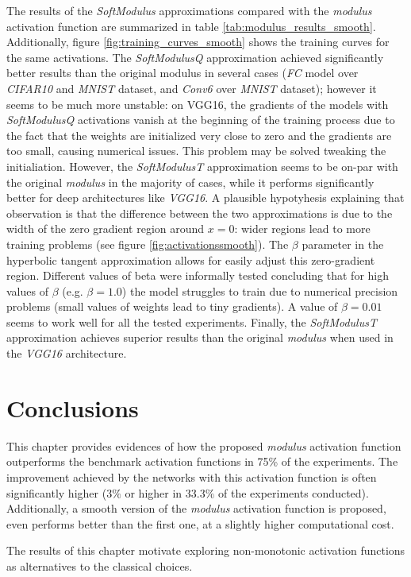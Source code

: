 The results of the \textit{SoftModulus} approximations compared with the \textit{modulus} activation function are summarized in table \ref{tab:modulus_results_smooth}. Additionally, figure \ref{fig:training_curves_smooth} shows the training curves for the same activations. The \textit{SoftModulusQ} approximation achieved significantly better results than the original modulus in several cases (\textit{FC} model over \textit{CIFAR10} and \textit{MNIST} dataset, and \textit{Conv6} over \textit{MNIST} dataset); however it seems to be much more unstable: on VGG16, the gradients of the models with \textit{SoftModulusQ} activations vanish at the beginning of the training process due to the fact that the weights are initialized very close to zero and the gradients are too small, causing numerical issues. This problem may be solved tweaking the initialiation. However, the \textit{SoftModulusT} approximation seems to be on-par with the original \textit{modulus} in the majority of cases, while it performs significantly better for deep architectures like \textit{VGG16}. A plausible hypotyhesis explaining that observation is  that the difference between the two approximations is due to the width of the zero gradient region around $x=0$: wider regions lead to more training problems (see figure \ref{fig:activationssmooth}). The $\beta$ parameter in the hyperbolic tangent approximation allows for easily adjust this zero-gradient region. Different values of beta were informally tested concluding that for high values of $\beta$ (e.g. $\beta=1.0$) the model struggles to train due to numerical precision problems (small values of weights lead to tiny gradients). A value of $\beta=0.01$ seems to work well for all the tested experiments. Finally, the \textit{SoftModulusT} approximation achieves superior results than the original \textit{modulus} when used in the \textit{VGG16} architecture.




\section{Conclusions} \label{sec:modulus_conclusions}
This chapter provides evidences of how the proposed \textit{modulus} activation function outperforms the benchmark activation functions in 75\% of the experiments. The improvement achieved by the networks with this activation function is often significantly higher ($3\%$ or higher in 33.3$\%$ of the experiments conducted). Additionally, a smooth version of the \textit{modulus} activation function is proposed, even performs better than the first one, at a slightly higher computational cost.

The results of this chapter motivate exploring non-monotonic activation functions as alternatives to the classical choices.




